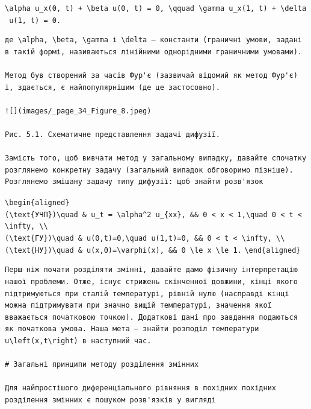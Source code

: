 \documentclass[
  ukrainian,
]{article}
\begin{document}
\texttt{\textbackslash{}alpha\ u\_x(0,\ t)\ +\ \textbackslash{}beta\ u(0,\ t)\ =\ 0,\ \textbackslash{}qquad\ \textbackslash{}gamma\ u\_x(1,\ t)\ +\ \textbackslash{}delta\ u(1,\ t)\ =\ 0.}

\begin{verbatim}
де \alpha, \beta, \gamma і \delta — константи (граничні умови, задані в такій формі, називаються лінійними однорідними граничними умовами).

Метод був створений за часів Фур'є (зазвичай відомий як метод Фур'є) і, здається, є найпопулярнішим (де це застосовно).

![](images/_page_34_Figure_8.jpeg)

Рис. 5.1. Схематичне представлення задачі дифузії.

Замість того, щоб вивчати метод у загальному випадку, давайте спочатку розглянемо конкретну задачу (загальний випадок обговоримо пізніше). Розглянемо змішану задачу типу дифузії: щоб знайти розв'язок
\end{verbatim}

\texttt{\textbackslash{}begin\{aligned\}}
\texttt{(\textbackslash{}text\{УЧП\})\textbackslash{}quad\ \&\ u\_t\ =\ \textbackslash{}alpha\^{}2\ u\_\{xx\},\ \&\&\ 0\ \textless{}\ x\ \textless{}\ 1,\textbackslash{}quad\ 0\ \textless{}\ t\ \textless{}\ \textbackslash{}infty,\ \textbackslash{}\textbackslash{}}
\texttt{(\textbackslash{}text\{ГУ\})\textbackslash{}quad\ \&\ u(0,t)=0,\textbackslash{}quad\ u(1,t)=0,\ \&\&\ 0\ \textless{}\ t\ \textless{}\ \textbackslash{}infty,\ \textbackslash{}\textbackslash{}}
\texttt{(\textbackslash{}text\{НУ\})\textbackslash{}quad\ \&\ u(x,0)=\textbackslash{}varphi(x),\ \&\&\ 0\ \textbackslash{}le\ x\ \textbackslash{}le\ 1.}
\texttt{\textbackslash{}end\{aligned\}}

\begin{verbatim}
Перш ніж почати розділяти змінні, давайте дамо фізичну інтерпретацію нашої проблеми. Отже, існує стрижень скінченної довжини, кінці якого підтримуються при сталій температурі, рівній нулю (насправді кінці можна підтримувати при значно вищій температурі, значення якої вважається початковою точкою). Додаткові дані про завдання подаються як початкова умова. Наша мета — знайти розподіл температури u\left(x,t\right) в наступний час.

# Загальні принципи методу розділення змінних

Для найпростішого диференціального рівняння в похідних похідних розділення змінних є пошуком розв'язків у вигляді
\end{verbatim}
\end{document}
